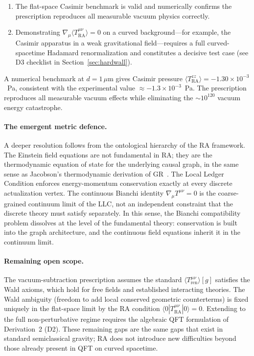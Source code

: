 \documentclass[11pt,a4paper]{article}
\theoremstyle{plain}
\theoremstyle{definition}
\theoremstyle{remark}
\newcommand{\Tact}{T^{\mu\nu}_{\mathrm{RA}}}
\begin{document}
\begin{enumerate}[label=(\roman*)]
  \begin{enumerate}[label=(\roman*),noitemsep]
    \item The flat-space Casimir benchmark is valid and numerically confirms the
    prescription reproduces all measurable vacuum physics correctly.
    \item Demonstrating $\nabla_\mu\langle\Tact\rangle = 0$ on a curved
    background---for example, the Casimir apparatus in a weak gravitational
    field---requires a full curved-spacetime Hadamard renormalization and constitutes
    a decisive test case (see D3 checklist in Section~\ref{sec:hardwall}).
  \end{enumerate}

  A numerical benchmark at $d = 1\,\mu$m gives Casimir pressure
  $\langle T^{zz}_{\mathrm{RA}}\rangle = -1.30 \times 10^{-3}$~Pa,
  consistent with the experimental value $\approx -1.3 \times
  10^{-3}$~Pa. The prescription reproduces all measurable vacuum effects
  while eliminating the $\sim\!10^{120}$ vacuum energy catastrophe.

  \paragraph{The emergent metric defence.}
  A deeper resolution follows from the ontological hierarchy of the RA
  framework. The Einstein field equations are not fundamental in RA;
  they are the thermodynamic equation of state for the underlying causal
  graph, in the same sense as Jacobson's thermodynamic derivation of
  GR~\citep{Jacobson1995}. The Local Ledger Condition enforces
  energy-momentum conservation exactly at every discrete actualization
  vertex. The continuous Bianchi identity $\nabla_\mu T^{\mu\nu} = 0$
  is the coarse-grained continuum limit of the LLC, not an independent
  constraint that the discrete theory must satisfy separately. In this
  sense, the Bianchi compatibility problem dissolves at the level of the
  fundamental theory: conservation is built into the graph architecture,
  and the continuous field equations inherit it in the continuum limit.

  \paragraph{Remaining open scope.}
  The vacuum-subtraction prescription assumes the standard
  $\langle T^{\mu\nu}_{\mathrm{ren}}\rangle[g]$ satisfies the Wald
  axioms, which hold for free fields and established interacting
  theories. The Wald ambiguity (freedom to add local conserved geometric
  counterterms) is fixed uniquely in the flat-space limit by the RA
  condition $\langle 0|\Tact|0\rangle = 0$. Extending to the full
  non-perturbative regime requires the algebraic QFT formulation of
  Derivation~2 (D2). These remaining gaps are the same gaps that exist
  in standard semiclassical gravity; RA does not introduce new
  difficulties beyond those already present in QFT on curved spacetime.\end{enumerate}
\end{document}
